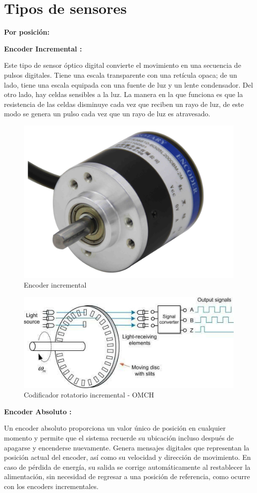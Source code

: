 \section{Tipos de sensores}
\vspace{10mm}
\textbf{Por posición:}
\vspace{5mm}

\textbf{Encoder Incremental :} 

Este tipo de sensor óptico digital convierte el movimiento en una secuencia de pulsos digitales. Tiene una escala transparente con una retícula opaca; de un lado, tiene una escala equipada con una fuente de luz y un lente condensador. Del otro lado, hay celdas sensibles a la luz. La manera en la que funciona es que la resistencia de las celdas disminuye cada vez que reciben un rayo de luz, de este modo se genera un pulso cada vez que un rayo de luz es atravesado.


\begin{figure}[h]
	\centering
	\includegraphics[width=0.4\linewidth]{portada/20150317193931229}
	\caption{Encoder incremental}
	\label{fig:20150317193931229}
\end{figure}

\begin{figure}[h]
	\centering
	\includegraphics[width=0.4\linewidth]{img/Sencoderincremental}
	\caption{Codificador rotatorio incremental - OMCH}
	\label{fig:Sencoderincremental}
\end{figure}
\vspace{10mm}
\textbf{Encoder Absoluto :} 

Un encoder absoluto proporciona un valor único de posición en cualquier momento y permite que el sistema recuerde su ubicación incluso después de apagarse y encenderse nuevamente. Genera mensajes digitales que representan la posición actual del encoder, así como su velocidad y dirección de movimiento. En caso de pérdida de energía, su salida se corrige automáticamente al restablecer la alimentación, sin necesidad de regresar a una posición de referencia, como ocurre con los encoders incrementales.\\\\\\\\\\\\

